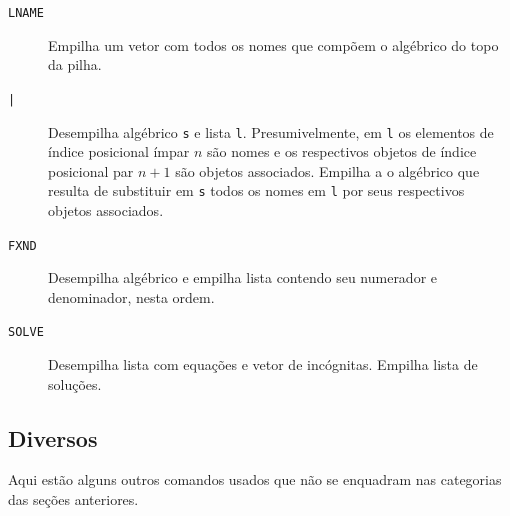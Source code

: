 \documentclass[12pt,a4paper]{report}
\newcommand{\kwd}[1]{\texttt{\textcolor{keyword}{#1}}}
\newcommand{\PIPE}{\kwd{|}}   %
\newcommand{\LNAME}{\kwd{LNAME}}   %
\newcommand{\FXND}{\kwd{FXND}}   %
\newcommand{\SOLVE}{\kwd{SOLVE}} %
\numberwithin{theorem}{chapter}
\begin{document}
\begin{description}
  \item[\LNAME]\label{LNAME} Empilha um vetor com todos os nomes que
    compõem o algébrico do topo da pilha.

  \item[\PIPE]\label{PIPE} Desempilha algébrico \texttt{s} e lista
    \texttt{l}.  Presumivelmente, em \texttt{l} os elementos de índice
    posicional ímpar \(n\) são nomes e os respectivos objetos de
    índice posicional par \(n+1\) são objetos associados.  Empilha a o
    algébrico que resulta de substituir em \texttt{s} todos os nomes
    em \texttt{l} por seus respectivos objetos associados.

  \item[\FXND]\label{FXND} Desempilha algébrico e empilha lista
    contendo seu numerador e denominador, nesta ordem.

  \item[\SOLVE]\label{SOLVE} Desempilha lista com equações e vetor de
    incógnitas.  Empilha lista de soluções.

\end{description}

\subsection{Diversos}

Aqui estão alguns outros comandos usados que não se enquadram nas
categorias das seções anteriores.
\end{document}
